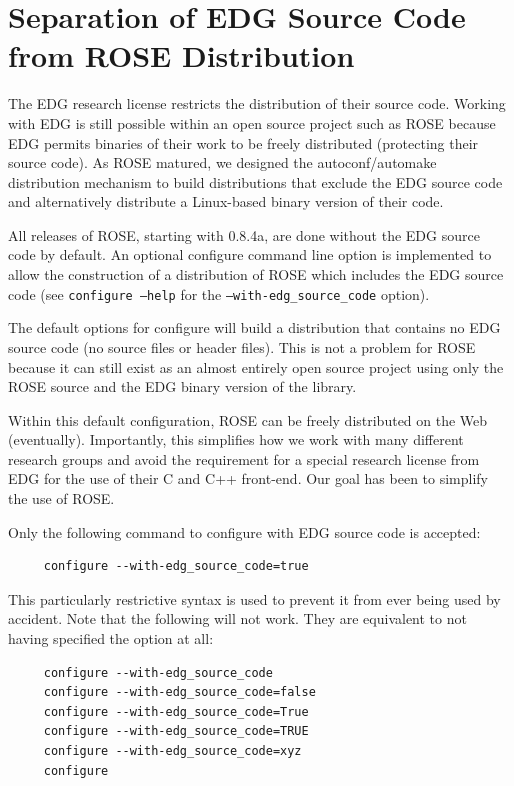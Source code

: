 
\section{Separation of EDG Source Code from ROSE Distribution}%

    The EDG research license restricts the distribution of their source code.
Working with EDG is still possible within an open source project such as ROSE because 
EDG permits binaries of their work to be freely distributed (protecting their source 
code).  As ROSE matured, we designed the autoconf/automake distribution mechanism
to build distributions that exclude the EDG source code and alternatively distribute
a Linux-based binary version of their code.

   All releases of ROSE, starting with 0.8.4a, are done without the EDG source code
by default.  An optional configure command line option is implemented to allow
the construction of a distribution of ROSE which includes the EDG source code
(see {\tt configure --help} for the {\tt --with-edg\_source\_code} option).

   The default options for configure will build a distribution that contains
no EDG source code (no source files or header files).  This is not a problem 
for ROSE because it can still exist as an almost entirely open source project
using only the ROSE source and the EDG binary version of the library.

  Within this default configuration, ROSE can be freely distributed on the Web
(eventually).  Importantly, this simplifies how we work with many different 
research groups and avoid the requirement for a special research license from
EDG for the use of their C and C++ front-end.  Our goal has been to simplify
the use of ROSE.

   Only the following command to configure with EDG source code is accepted:
{\indent
{\mySmallFontSize
\begin{verbatim}
     configure --with-edg_source_code=true
\end{verbatim} 
}}
This particularly restrictive syntax is used to prevent it from ever being used
by accident.  Note that the following will not work. They are equivalent to 
not having specified the option at all:
{\indent
{\mySmallFontSize
\begin{verbatim}
     configure --with-edg_source_code
     configure --with-edg_source_code=false
     configure --with-edg_source_code=True
     configure --with-edg_source_code=TRUE
     configure --with-edg_source_code=xyz
     configure 
\end{verbatim} 
}}

